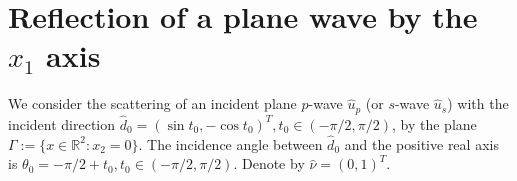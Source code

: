 \documentclass[12pt]{iopart}
\begin{document}
\newcommand{\mL}{\mathscr{L}}
\newcommand{\cT}{{\cal T}}
\newcommand{\cM}{{\cal M}}
\newcommand{\cE}{{\cal E}}
\newcommand{\cL}{{\cal L}}
\newcommand{\cF}{{\cal F}}
\newcommand{\cB}{{\cal B}}
\newcommand{\PML}{{\rm PML}}
\newcommand{\FEM}{{\rm FEM}}
\newcommand{\rd}{\,\mathrm{d}}

\renewcommand{\i}{\mathbf{i}}
\renewcommand{\v}{\mathbf{v}}
\renewcommand{\u}{\mathbf{u}}
\renewcommand{\r}{\mathbf{r}}
\newcommand{\gR}{{\mathbb{R}}}
\newcommand{\Z}{{\mathbb{Z}}}
\newcommand{\C}{{\mathbb{C}}}
\newcommand{\I}{{\mathbb{I}}}
\renewcommand{\Re}{\mathrm{Re}\,}
\renewcommand{\Im}{\mathrm{Im}\,}
\renewcommand{\div}{\mathrm{div}}
\newcommand{\curl}{\mathrm{curl}}
\newcommand{\Curl}{\mathbf{curl}}
\newcommand{\pv}{\mathrm{p.v.}}

\newcommand{\Np}{\mathbb{N}_p}
\newcommand{\Ns}{\mathbb{N}_s}
\newcommand{\Tp}{\mathbb{T}_p}
\newcommand{\Ts}{\mathbb{T}_s}
\newcommand{\Na}{\mathbb{N}_\alpha}
\newcommand{\Nb}{\mathbb{N}_\beta}
\newcommand{\Ta}{\mathbb{T}_\alpha}
\newcommand{\Tb}{\mathbb{T}_\beta}
\newcommand{\GG}{\mathcal{G}}

\newcommand{\N}{\mathbb{N}}
\newcommand{\D}{\mathbb{D}}
\newcommand{\T}{\mathbb{T}}
\newcommand{\A}{\mathbb{A}}
\newcommand{\B}{\mathbb{B}}
\newcommand{\G}{\mathbb{G}}
\newcommand{\F}{\mathbb{F}}
\newcommand{\R}{\mathbb{R}}
\newcommand{\W}{\mathbb{W}}
\newcommand{\V}{\mathbb{V}}
\newcommand{\U}{\mathbb{U}}
\newcommand{\J}{\mathbb{J}}
\newcommand{\Zg}{\mathbb{Z}}
\newcommand{\Gtheta}{\mathbb{\Theta}}
\newcommand{\Gphi}{\mathbb{\Phi}}

\newcommand{\be}{\begin{eqnarray}}
\newcommand{\ee}{\end{eqnarray}}
\newcommand{\ben}{\begin{eqnarray*}}
	\newcommand{\een}{\end{eqnarray*}}
\newcommand{\nn}{\nonumber}
\section{Reflection of a plane wave by the $x_1$ axis}

We consider the scattering of an incident plane $p$-wave  $\hat u_p$ (or $s$-wave $\hat u_s$) with the incident direction $\hat d_0=(\sin t_0, -\cos t_0)^T, t_0\in (-\pi/2,\pi/2)$, by the plane $\Gamma := \{x \in \R^2 :x _2 = 0\}$. 
The incidence angle between $\hat d_0$ and the positive real axis is $\theta_0=-\pi/2+t_0, t_0\in (-\pi/2,\pi/2)$. Denote by $\hat\nu=(0,1)^T$.
\end{document}
